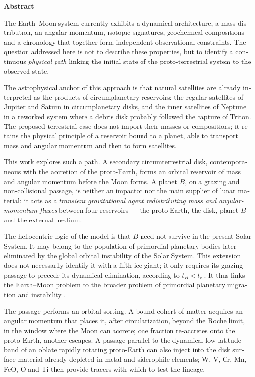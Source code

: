 \documentclass[11pt,a4paper,openany]{report}
\begin{document}
\bigskip
\begin{otherlanguage}{english}
\begin{center}{\Large\bfseries Abstract}\end{center}
\medskip

The Earth--Moon system currently exhibits a dynamical architecture, a mass distribution, an
angular momentum, isotopic signatures, geochemical compositions and a chronology that together
form independent observational constraints. The question addressed here is not to describe these
properties, but to identify a continuous \emph{physical path} linking the initial state of the
proto-terrestrial system to the observed state.

The astrophysical anchor of this approach is that natural satellites are already interpreted as
the products of circumplanetary reservoirs: the regular satellites of Jupiter and Saturn in
circumplanetary disks, and the inner satellites of Neptune in a reworked system where a debris
disk probably followed the capture of Triton. The proposed terrestrial case does not import their
masses or compositions; it retains the physical principle of a reservoir bound to a planet, able
to transport mass and angular momentum and then to form satellites.

This work explores such a path. A secondary circumterrestrial disk, contemporaneous with the
accretion of the proto-Earth, forms an orbital reservoir of mass and angular momentum before the
Moon forms. A planet $B$, on a grazing and non-collisional passage, is neither an impactor nor the
main supplier of lunar material: it acts as a \emph{transient gravitational agent redistributing
mass and angular-momentum fluxes} between four reservoirs --- the proto-Earth, the disk, planet
$B$ and the external medium.

The heliocentric logic of the model is that $B$ need not survive in the present Solar System. It may
belong to the population of primordial planetary bodies later eliminated by the global orbital
instability of the Solar System. This extension does not necessarily identify it with a fifth ice
giant; it only requires its grazing passage to precede its dynamical elimination, according to
$t_B<t_{\mathrm{ej}}$. It thus links the Earth--Moon problem to the broader problem of primordial
planetary migration and instability
\cite{Tsiganis2005,Gomes2005,Nesvorny2011,NesvornyMorbidelli2012,Liu2022,Clement2018}.

The passage performs an orbital sorting. A bound cohort of matter acquires an angular momentum
that places it, after circularization, beyond the Roche limit, in the window where the Moon can
accrete; one fraction re-accretes onto the proto-Earth, another escapes. A passage parallel to the
dynamical low-latitude band of an oblate rapidly rotating proto-Earth can also inject into the disk
surface material already depleted in metal and siderophile elements; W, V, Cr, Mn, FeO, O and Ti
then provide tracers with which to test the lineage.


\end{otherlanguage}
\end{document}

